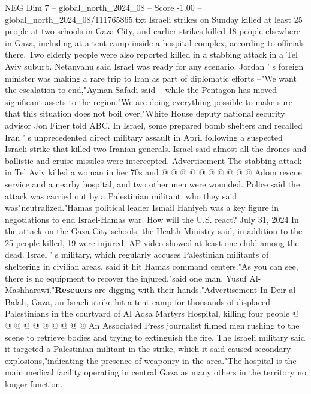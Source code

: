 \begin{textsample}{NEG Dim 7 – global\_north\_2024\_08 – Score -1.00 – global\_north\_2024\_08/111765865.txt}  \label{ex:f7_neg_438}
Israeli strikes on Sunday killed at least 25 people at two schools in Gaza City, and earlier strikes killed 18 people elsewhere in Gaza, including at a tent camp inside a hospital complex, according to officials there.
Two elderly people were also reported killed in a stabbing attack in a Tel Aviv suburb.
Netanyahu said Israel was ready for any scenario.
Jordan ' s foreign minister was making a rare trip to Iran as part of diplomatic efforts --"We want the escalation to end,"Ayman Safadi said -- while the Pentagon has moved significant assets to the region."We are doing everything possible to make sure that this situation does not boil over,"White House deputy national security advisor Jon Finer told ABC.
In Israel, some prepared bomb shelters and recalled Iran ' s unprecedented direct military assault in April following a suspected Israeli strike that killed two Iranian generals.
Israel said almost all the drones and ballistic and cruise missiles were intercepted.
Advertisement The stabbing attack in Tel Aviv killed a woman in her 70s and @ @ @ @ @ @ @ @ @ @ Adom rescue service and a nearby hospital, and two other men were wounded.
Police said the attack was carried out by a Palestinian militant, who they said was"neutralized."Hamas political leader Ismail Haniyeh was a key figure in negotiations to end Israel-Hamas war.
How will the U.S. react?
July 31, 2024 In the attack on the Gaza City schools, the Health Ministry said, in addition to the 25 people killed, 19 were injured.
AP video showed at least one child among the dead.
Israel ' s military, which regularly accuses Palestinian militants of sheltering in civilian areas, said it hit Hamas command centers."As you can see, there is no equipment to recover the injured,"said one man, Yusuf Al-Mashharawi."\textbf{Rescuers} are digging with their hands."Advertisement In Deir al Balah, Gaza, an Israeli strike hit a tent camp for thousands of displaced Palestinians in the courtyard of Al Aqsa Martyrs Hospital, killing four people @ @ @ @ @ @ @ @ @ @ An Associated Press journalist filmed men rushing to the scene to retrieve bodies and trying to extinguish the fire.
The Israeli military said it targeted a Palestinian militant in the strike, which it said caused secondary explosions,"indicating the presence of weaponry in the area."The hospital is the main medical facility operating in central Gaza as many others in the territory no longer function.

\end{textsample}
